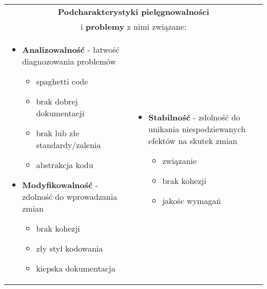 \documentclass[../main.tex]{subfiles}
\begin{document}
    \begin{table}[H]
        \begin{center}
            \begin{tabular}{p{8cm} | p{8cm}}
                \multicolumn{2}{c}{\textbf{Podcharakterystyki pielęgnowalności}}\\
                \multicolumn{2}{c}{i \textbf{problemy} z nimi związane:}\\
                \hline
                \begin{itemize}
                    \item \textbf{Analizowalność} - łatwość diagnozowania problemów
                    \begin{itemize}
                        \item spaghetti code
                        \item brak dobrej dokumentacji
                        \item brak lub złe standardy/zalenia
                        \item abstrakcja kodu
                    \end{itemize}

                    \item \textbf{Modyfikowalność} - zdolność do wprowadzania zmian
                    \begin{itemize}
                        \item brak kohezji
                        \item zły styl kodowania
                        \item kiepska dokumentacja
                    \end{itemize}
                \end{itemize}
                &
                \begin{itemize}
                    \item \textbf{Stabilność} - zdolność do unikania niespodziewanych efektów na skutek zmian
                    \begin{itemize}
                        \item związanie
                        \item brak kohezji
                        \item jakośc wymagań
                    \end{itemize}


\end{itemize}
\end{tabular}
\end{center}
\end{table}
\end{document}
